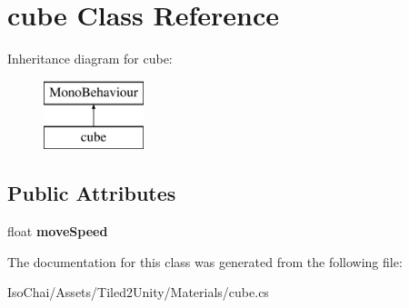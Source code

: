 \hypertarget{classcube}{}\section{cube Class Reference}
\label{classcube}
Inheritance diagram for cube\+:\begin{figure}[H]
\begin{center}
\leavevmode
\includegraphics[height=2.000000cm]{classcube}
\end{center}
\end{figure}
\subsection*{Public Attributes}
\begin{DoxyCompactItemize}
\item 
\mbox{\label{classcube_a07418155a0ab3c3208d92dd5d218ead4}} 
float {\bfseries move\+Speed}
\end{DoxyCompactItemize}


The documentation for this class was generated from the following file\+:\begin{DoxyCompactItemize}
\item 
Iso\+Chai/\+Assets/\+Tiled2\+Unity/\+Materials/cube.\+cs\end{DoxyCompactItemize}
